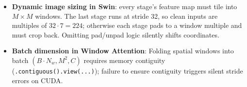\begin{trap}
\begin{itemize}
\item \textbf{Dynamic image sizing in Swin}: every stage's feature map must tile into $M\times M$ windows. The last stage runs at stride 32, so clean inputs are multiples of $32 \cdot 7 = 224$; otherwise each stage pads to a window multiple and must crop back. Omitting pad/unpad logic silently shifts coordinates.
\item \textbf{Batch dimension in Window Attention}: Folding spatial windows into batch $(B \cdot N_w, M^2, C)$ requires memory contiguity (\lstinline|.contiguous().view(...)|); failure to ensure contiguity triggers silent stride errors on CUDA.
\end{itemize}
\end{trap}
